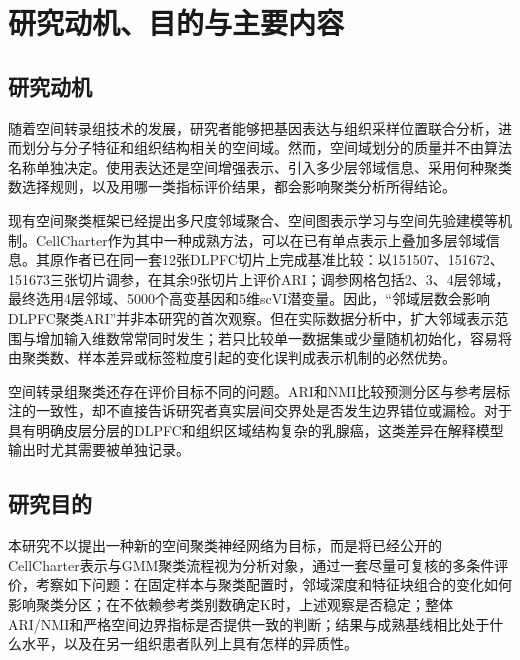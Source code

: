 \section{研究动机、目的与主要内容}
\label{sec:cc-intro-module-v1}

\subsection{研究动机}
随着空间转录组技术的发展，研究者能够把基因表达与组织采样位置联合分析，进而划分与分子特征和组织结构相关的空间域。然而，空间域划分的质量并不由算法名称单独决定。使用表达还是空间增强表示、引入多少层邻域信息、采用何种聚类数选择规则，以及用哪一类指标评价结果，都会影响聚类分析所得结论。

现有空间聚类框架已经提出多尺度邻域聚合、空间图表示学习与空间先验建模等机制。CellCharter作为其中一种成熟方法，可以在已有单点表示上叠加多层邻域信息\cite{varrone2024}。其原作者已在同一套12张DLPFC切片上完成基准比较：以151507、151672、151673三张切片调参，在其余9张切片上评价ARI；调参网格包括2、3、4层邻域，最终选用4层邻域、5000个高变基因和5维scVI潜变量\cite{varrone2024,cellcharteranalyses2024}。因此，“邻域层数会影响DLPFC聚类ARI”并非本研究的首次观察。但在实际数据分析中，扩大邻域表示范围与增加输入维数常常同时发生；若只比较单一数据集或少量随机初始化，容易将由聚类数、样本差异或标签粒度引起的变化误判成表示机制的必然优势。

空间转录组聚类还存在评价目标不同的问题。ARI和NMI比较预测分区与参考层标注的一致性，却不直接告诉研究者真实层间交界处是否发生边界错位或漏检。对于具有明确皮层分层的DLPFC和组织区域结构复杂的乳腺癌，这类差异在解释模型输出时尤其需要被单独记录。

\subsection{研究目的}
本研究不以提出一种新的空间聚类神经网络为目标，而是将已经公开的CellCharter表示与GMM聚类流程视为分析对象，通过一套尽量可复核的多条件评价，考察如下问题：在固定样本与聚类配置时，邻域深度和特征块组合的变化如何影响聚类分区；在不依赖参考类别数确定K时，上述观察是否稳定；整体ARI/NMI和严格空间边界指标是否提供一致的判断；结果与成熟基线相比处于什么水平，以及在另一组织患者队列上具有怎样的异质性。

